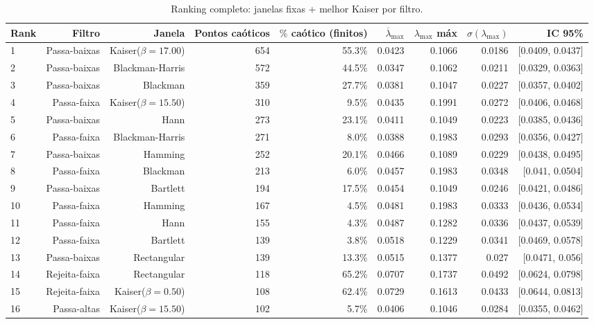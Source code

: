   \begin{longtable}{lrrrrrrrr}
    \caption{Ranking completo: janelas fixas + melhor Kaiser por filtro.} \\
    \toprule
    Rank & Filtro & Janela & Pontos caóticos & $\%$ caótico (finitos) & $\overline{\lambda}_{\max}$ & $\lambda_{\max}$ máx & $\sigma(\lambda_{\max})$ & IC 95\% \\
    \midrule
    1 & Passa-baixas & Kaiser($\beta=17.00$) & 654 & 55.3\% & 0.0423 & 0.1066 & 0.0186 & [0.0409, 0.0437] \\
    2 & Passa-baixas & Blackman-Harris & 572 & 44.5\% & 0.0347 & 0.1062 & 0.0211 & [0.0329, 0.0363] \\
    3 & Passa-baixas & Blackman & 359 & 27.7\% & 0.0381 & 0.1047 & 0.0227 & [0.0357, 0.0402] \\
    4 & Passa-faixa & Kaiser($\beta=15.50$) & 310 & 9.5\% & 0.0435 & 0.1991 & 0.0272 & [0.0406, 0.0468] \\
    5 & Passa-baixas & Hann & 273 & 23.1\% & 0.0411 & 0.1049 & 0.0223 & [0.0385, 0.0436] \\
    6 & Passa-faixa & Blackman-Harris & 271 & 8.0\% & 0.0388 & 0.1983 & 0.0293 & [0.0356, 0.0427] \\
    7 & Passa-baixas & Hamming & 252 & 20.1\% & 0.0466 & 0.1089 & 0.0229 & [0.0438, 0.0495] \\
    8 & Passa-faixa & Blackman & 213 & 6.0\% & 0.0457 & 0.1983 & 0.0348 & [0.041, 0.0504] \\
    9 & Passa-baixas & Bartlett & 194 & 17.5\% & 0.0454 & 0.1049 & 0.0246 & [0.0421, 0.0486] \\
    10 & Passa-faixa & Hamming & 167 & 4.5\% & 0.0481 & 0.1983 & 0.0333 & [0.0436, 0.0534] \\
    11 & Passa-faixa & Hann & 155 & 4.3\% & 0.0487 & 0.1282 & 0.0336 & [0.0437, 0.0539] \\
    12 & Passa-faixa & Bartlett & 139 & 3.8\% & 0.0518 & 0.1229 & 0.0341 & [0.0469, 0.0578] \\
    13 & Passa-baixas & Rectangular & 139 & 13.3\% & 0.0515 & 0.1377 & 0.027 & [0.0471, 0.056] \\
    14 & Rejeita-faixa & Rectangular & 118 & 65.2\% & 0.0707 & 0.1737 & 0.0492 & [0.0624, 0.0798] \\
    15 & Rejeita-faixa & Kaiser($\beta=0.50$) & 108 & 62.4\% & 0.0729 & 0.1613 & 0.0433 & [0.0644, 0.0813] \\
    16 & Passa-altas & Kaiser($\beta=15.50$) & 102 & 5.7\% & 0.0406 & 0.1046 & 0.0284 & [0.0355, 0.0462] \\

\end{longtable}
